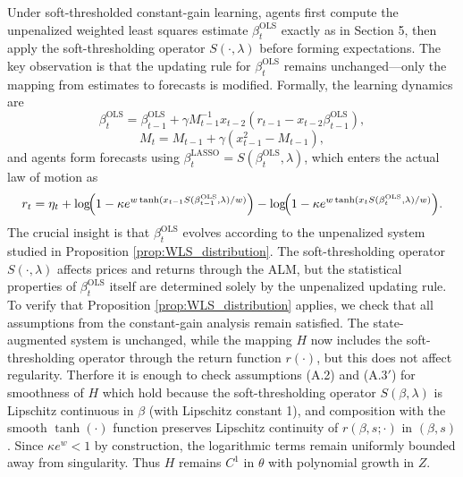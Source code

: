 \documentclass[11pt]{article}
\begin{document}
Under soft-thresholded constant-gain learning, agents first compute the unpenalized weighted least squares estimate $\beta^{\text{OLS}}_t$ exactly as in Section 5, then apply the soft-thresholding operator $S(\cdot,\lambda)$ before forming expectations. 
The key observation is that the updating rule for $\beta^{\text{OLS}}_t$ remains unchanged—only the mapping from estimates to forecasts is modified.
Formally, the learning dynamics are
\[
\beta^{\text{OLS}}_t = \beta^{\text{OLS}}_{t-1} + \gamma M^{-1}_{t-1} x_{t-2} (r_{t-1} - x_{t-2} \beta^{\text{OLS}}_{t-1}),
\]
\[
M_t = M_{t-1} + \gamma (x_{t-1}^2 - M_{t-1}),
\]
and agents form forecasts using $\beta_t^{\text{LASSO}} = S(\beta^{\text{OLS}}_t, \lambda)$, which enters the actual law of motion as
\[
r_{t} = \eta_{t} + \log\!\Bigl(1-\kappa e^{w\tanh(x_{t-1} S(\beta^{\text{OLS}}_{t-1}, \lambda)/w)}\Bigr) - \log\!\Bigl(1-\kappa e^{w\tanh(x_{t} S(\beta^{\text{OLS}}_{t}, \lambda)/w)}\Bigr).
\]
The crucial insight is that $\beta^{\text{OLS}}_t$ evolves according to the unpenalized system studied in Proposition \ref{prop:WLS_distribution}. The soft-thresholding operator $S(\cdot,\lambda)$ affects prices and returns through the ALM, but the statistical properties of $\beta^{\text{OLS}}_t$ itself are determined solely by the unpenalized updating rule. 
To verify that Proposition \ref{prop:WLS_distribution} applies, we check that all assumptions from the constant-gain analysis remain satisfied. The state-augmented system is unchanged, while the mapping $H$ now includes the soft-thresholding operator through the return function $r(\cdot)$, but this does not affect regularity.
Therfore it is enough to check assumptions (A.2) and (A.3$'$) for smoothness of $H$ which hold because
the soft-thresholding operator $S(\beta,\lambda)$ is Lipschitz continuous in $\beta$ (with Lipschitz constant 1), and composition with the smooth $\tanh(\cdot)$ function preserves Lipschitz continuity of $r(\beta,s;\cdot)$ in $(\beta,s)$. 
Since $\kappa e^w < 1$ by construction, the logarithmic terms remain uniformly bounded away from singularity. Thus $H$ remains $C^1$ in $\theta$ with polynomial growth in $Z$.
\end{document}
